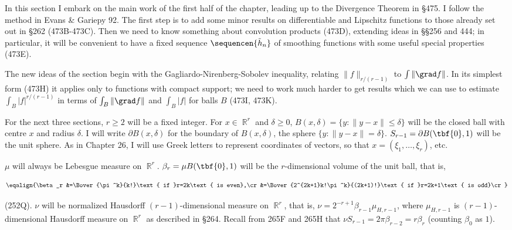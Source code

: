 
\def\chaptername{Geometric measure theory}
\def\sectionname{Poincar\'e's inequality}


In this section I embark on the main work of the first half of the
chapter, leading up to
the Divergence Theorem in \S475.   I follow the method in 
{\smc Evans \& Gariepy 92}.   The first step is to add some minor results on
differentiable and Lipschitz functions to those already set out in \S262
(473B-473C).   Then we need to know something about convolution products
(473D), extending ideas in \S\S256 and 444;  in particular, it will be
convenient to have a fixed sequence $\sequencen{\tilde h_n}$ of
smoothing functions with some useful special properties (473E).

The new ideas of the section begin with the Gagliardo-Nirenberg-Sobolev
inequality, relating $\|f\|_{r/(r-1)}$ to $\int\|\grad f\|$.   In its
simplest form (473H) it applies only to functions with compact support;
we need to work much harder to get results which we can use to estimate
$\int_B|f|^{r/(r-1)}$ in terms of $\int_B\|\grad f\|$ and $\int_B|f|$ for
balls $B$ (473I, 473K).

 For the next three sections, 
$r\ge 2$ will be a fixed integer.   For $x\in\BbbR^r$ and $\delta\ge 0$,
$B(x,\delta)=\{y:\|y-x\|\le\delta\}$ will be the closed ball with centre
$x$ and radius $\delta$.
I will write $\partial B(x,\delta)$ for the boundary of $B(x,\delta)$,
the sphere  $\{y:\|y-x\|=\delta\}$.
$S_{r-1}=\partial B(\tbf{0},1)$ will be the unit sphere.
As in Chapter 26, I will use Greek letters to represent coordinates of
vectors, so that $x=(\xi_1,\ldots,\xi_r)$, etc.

$\mu$ will always be Lebesgue measure on $\BbbR^r$.
$\beta_r=\mu B(\tbf{0},1)$ will be the $r$-dimensional volume of the
unit ball, that is,

$$\eqalign{\beta_r
&=\Bover{\pi^k}{k!}\text{ if }r=2k\text{ is even},\cr
&=\Bover{2^{2k+1}k!\pi^k}{(2k+1)!}\text{ if }r=2k+1\text{ is odd}\cr}$$

\noindent (252Q).
$\nu$ will be normalized Hausdorff $(r-1)$-dimensional measure on
$\BbbR^r$, that is,
$\nu=2^{-r+1}\beta_{r-1}\mu_{H,r-1}$, where $\mu_{H,r-1}$ is
$(r-1)$-dimensional Hausdorff measure on $\BbbR^r$ as described in \S264.
Recall from 265F and 265H that
$\nu S_{r-1}=2\pi\beta_{r-2}=r\beta_r$ (counting $\beta_0$ as $1$).

